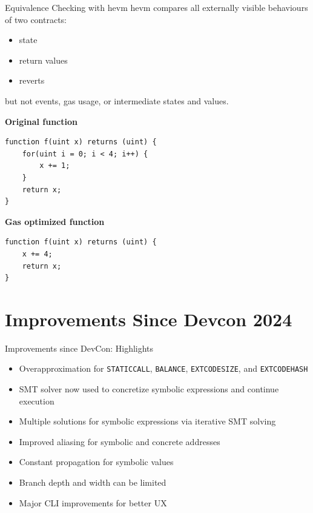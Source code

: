 \documentclass[aspectratio=169]{beamer}
\begin{document}
\begin{frame}[fragile=singleslide]{Equivalence Checking with hevm}
hevm compares all externally visible behaviours of two contracts:
\begin{itemize}
    \item state
    \item return values
    \item reverts
\end{itemize}
but not events, gas usage, or intermediate states and values.
\bigskip

\begin{minipage}[t]{0.45\textwidth}
\textbf{Original function}
\begin{Verbatim}[fontsize=\small]
function f(uint x) returns (uint) {
    for(uint i = 0; i < 4; i++) {
        x += 1;
    }
    return x;
}
\end{Verbatim}
\end{minipage}\qquad
\begin{minipage}[t]{0.45\textwidth}
\textbf{Gas optimized function}
\begin{Verbatim}[fontsize=\small]
function f(uint x) returns (uint) {
    x += 4;
    return x;
}
\end{Verbatim}
\end{minipage}
\end{frame}

\section{Improvements Since Devcon 2024}
\begin{frame}{Improvements since DevCon: Highlights}
\begin{itemize}
    \item Overapproximation for \texttt{STATICCALL}, \texttt{BALANCE},
        \texttt{EXTCODESIZE}, and \texttt{EXTCODEHASH}
    \item SMT solver now used to concretize symbolic expressions and continue execution
    \item Multiple solutions for symbolic expressions via iterative SMT solving
    \item Improved aliasing for symbolic and concrete addresses
    \item Constant propagation for symbolic values
    \item Branch depth and width can be limited
    \item Major CLI improvements for better UX
\end{itemize}
\end{frame}
\end{document}
